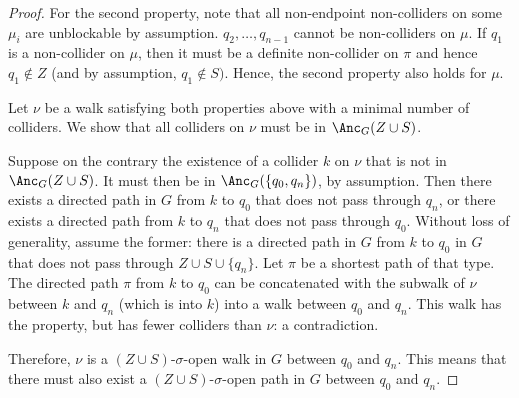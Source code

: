 \begin{proof}
  For the second property, note that all non-endpoint non-colliders on some $\mu_i$ are unblockable by assumption.
  $q_2,\dots,q_{n-1}$ cannot be non-colliders on $\mu$.
  If $q_1$ is a non-collider on $\mu$, then it must be a definite non-collider on $\pi$ and hence $q_1 \notin Z$ (and by assumption, $q_1 \notin S)$.
  Hence, the second property also holds for $\mu$.

  Let $\nu$ be a walk satisfying both properties above with a minimal number of colliders.
  We show that all colliders on $\nu$ must be in $\Anc_{G}(Z \cup S)$. 

  Suppose on the contrary the existence of a collider $k$ on $\nu$ that is not in $\Anc_G(Z \cup S)$. 
  It must then be in $\Anc_G(\{q_0,q_n\})$, by assumption.
  Then there exists a directed path in $G$ from $k$ to $q_0$ that does not pass through $q_n$, or there exists a directed path from $k$ to $q_n$ that does not pass through $q_0$.
  Without loss of generality, assume the former:
  there is a directed path in $G$ from $k$ to $q_0$ in $G$ that does not pass through $Z \cup S \cup \{q_n\}$.
  Let $\pi$ be a shortest path of that type.
  The directed path $\pi$ from $k$ to $q_0$ can be concatenated with the subwalk of $\nu$ between $k$ and $q_n$ (which is into $k$) into a walk between $q_0$ and $q_n$.
  This walk has the property, but has fewer colliders than $\nu$: a contradiction.

  Therefore, $\nu$ is a $(Z \cup S)$-$\sigma$-open walk in $G$ between $q_0$ and $q_n$.
  This means that there must also exist a $(Z \cup S)$-$\sigma$-open path in $G$ between $q_0$ and $q_n$.
\end{proof}

